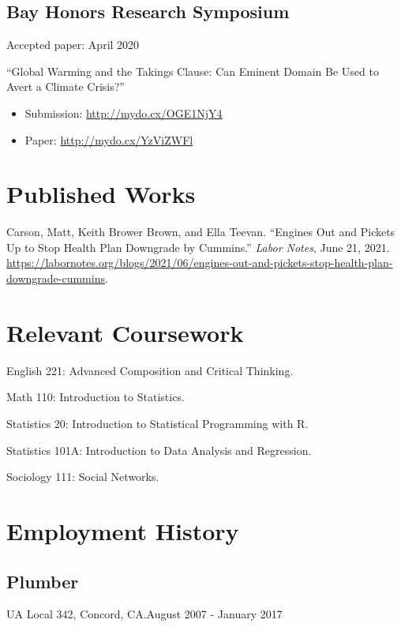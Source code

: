 \documentclass[
]{article}
\providecommand{\tightlist}{%
  \setlength{\itemsep}{0pt}\setlength{\parskip}{0pt}}
\begin{document}
\hypertarget{bay-honors-research-symposium}{%
\subsection{Bay Honors Research
Symposium}\label{bay-honors-research-symposium}}

Accepted paper: \hfill April 2020

``Global Warming and the Takings Clause: Can Eminent Domain Be Used to
Avert a Climate Crisis?''

\begin{itemize}
\tightlist
\item
  Submission: \url{http://mydo.cx/OGE1NjY4}
\item
  Paper: \url{http://mydo.cx/YzViZWFl}
\end{itemize}

\section{Published Works}

Carson, Matt, Keith Brower Brown, and Ella Teevan. ``Engines Out and
Pickets Up to Stop Health Plan Downgrade by Cummins.'' \emph{Labor
Notes}, June 21, 2021.
\url{https://labornotes.org/blogs/2021/06/engines-out-and-pickets-stop-health-plan-downgrade-cummins}.

\section{Relevant Coursework}

English 221: Advanced Composition and Critical Thinking.

Math 110: Introduction to Statistics.

Statistics 20: Introduction to Statistical Programming with R.

Statistics 101A: Introduction to Data Analysis and Regression.

Sociology 111: Social Networks.

\section{Employment History}

\hypertarget{plumber}{%
\subsection{Plumber}\label{plumber}}

UA Local 342, Concord, CA.\newline August 2007 - January 2017
\end{document}
